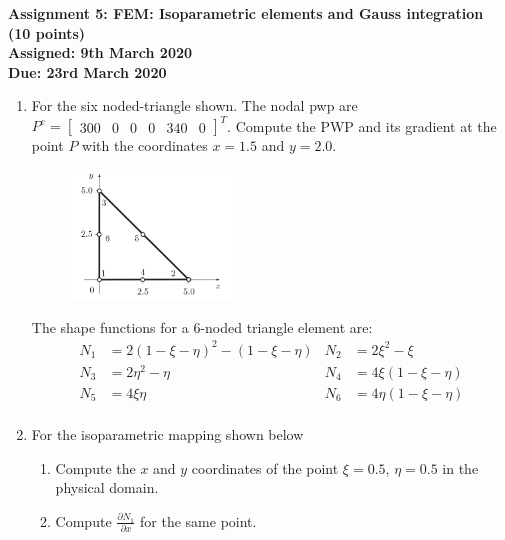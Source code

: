 \documentclass[a4paper,12pt]{article}
\begin{document}
\begin{centering}
	\textbf{
		Assignment 5: FEM: Isoparametric elements and Gauss integration\\ (10 points)\\
		Assigned: 9th March 2020\\
		Due: 23rd March 2020\\
	}
\end{centering}

\vspace{1em}
 
\begin{enumerate}

	\item For the six noded-triangle shown. The nodal pwp are $P^e = \begin{bmatrix}300 & 0 & 0 & 0 & 340 & 0 \end{bmatrix}^T$. Compute the PWP and its gradient at the point $P$ with the coordinates $x = 1.5$ and $y = 2.0$.

		
		\begin{figure}[!h]
			\centering
			\includegraphics[width=0.4\textwidth]{figs/6noded-triangle.png}
		\end{figure}

	The shape functions for a 6-noded triangle element are:
	\begin{align*}
	N_1 & = 2(1-\xi -\eta)^2 - (1 -\xi -\eta) & N_2 & = 2\xi^2 -\xi\\
	N_3 & = 2\eta^2 -\eta & N_4 & = 4\xi(1 - \xi - \eta)\\
	N_5 & = 4\xi\eta & N_6 & = 4 \eta(1 - \xi - \eta)\\
	\end{align*}
	
	\item For the isoparametric mapping shown below
		\begin{enumerate}
			\item Compute the $x$ and $y$ coordinates of the point $\xi = 0.5$, $\eta = 0.5$ in the physical domain.
			\item Compute $\frac{\partial N_1}{\partial x}$ for the same point.
		\end{enumerate}
		

\end{enumerate}
\end{document}
